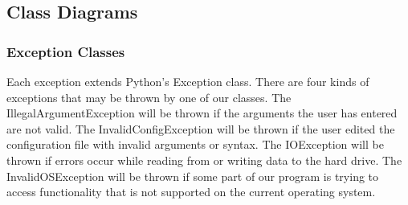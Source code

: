 \documentclass[parskip=full]{scrartcl}
\begin{document}
\subsection{Class Diagrams}

\subsubsection{Exception Classes}

Each exception extends Python's Exception class.
There are four kinds of exceptions that may be thrown by one of our classes.\newline\newline
The IllegalArgumentException will be thrown if the arguments the user has entered are not valid.\newline\newline
The InvalidConfigException will be thrown if the user edited the configuration file with invalid arguments or syntax.\newline\newline
The IOException will be thrown if errors occur while reading from or writing data to the hard drive.\newline\newline
The InvalidOSException will be thrown if some part of our program is trying to access functionality that is not supported on the current operating system.


\begin{figure}[h]
\begin{center}

\label{Exception Classes}
\end{center}
\end{figure}
\newpage
\end{document}
